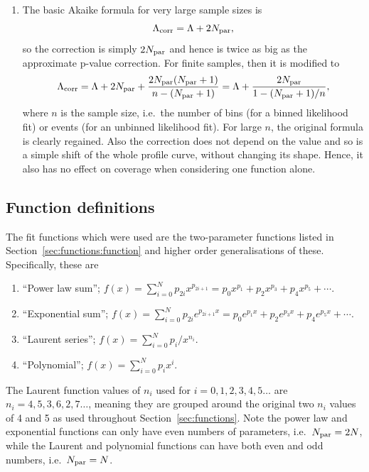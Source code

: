 \begin{enumerate}
\item %
The basic Akaike formula for very large sample sizes is
\begin{displaymath}
\Lambda_{\mathrm{corr}} = \textrm{\ensuremath{\Lambda}} + 2N_{\rm par},
\end{displaymath}
so the correction is simply $ 2N_{\rm par}$ and
hence is twice as big as the approximate p-value correction.
For finite samples, then it is modified to
\begin{displaymath}
\Lambda_{\mathrm{corr}}
= \textrm{\ensuremath{\Lambda}} + 2N_{\rm par}  + \frac{2N_{\rm par}(N_{\rm par}+1)}{n-(N_{\rm par}+1)}
= \textrm{\ensuremath{\Lambda}} + \frac{2N_{\rm par}}{1-(N_{\rm par}+1)/n},
\end{displaymath}
where $n$ is the sample size, i.e.~the number of bins (for a binned likelihood
fit) or events (for an unbinned likelihood fit). For large $n$, the original
formula is clearly regained. 
Also the correction does not depend on the \nll value and
so is a simple shift of
the whole profile curve, without changing its shape.
Hence, it also has no effect on coverage when considering one function alone.
\end{enumerate}

\subsection{Function definitions}
\label{sec:correction:functions}
The fit functions which were used are the two-parameter functions listed in
Section~\ref{sec:functions:function} and higher order generalisations of
these. Specifically, these are
\begin{enumerate}
\item
``Power law sum''; $f(x) = \sum_{i=0}^N p_{2i} x^{p_{2i+1}} = p_{0}x^{p_{1}} + p_{2}x^{p_{3}} + p_{4}x^{p_{5}}+\cdots$.
\item
``Exponential sum''; $f(x) = \sum_{i=0}^N p_{2i} e^{p_{2i+1}x} = p_{0} e^{p_{1}x} + p_{2} e^{p_{3}x} + p_{4} e^{p_{5}x}+\cdots$.
\item
``Laurent series''; $f(x) = \sum_{i=0}^N p_i/x^{n_i}$.
\item
``Polynomial''; $f(x) = \sum_{i=0}^N p_i x^i$.
\end{enumerate}
The Laurent function values of $n_{i}$ used for $i=0,1,2,3,4,5\dots$ are
$n_{i}=4,5,3,6,2,7\dots$, meaning they are grouped around the original
two $n_{i}$ values of 4 and 5 as used throughout Section~\ref{sec:functions}.
Note the power law and exponential functions can only have even numbers of
parameters, i.e.~$N_{\rm par}=2N$, while the Laurent and polynomial functions
can have both even and odd numbers, i.e.~$N_{\rm par}=N$.


